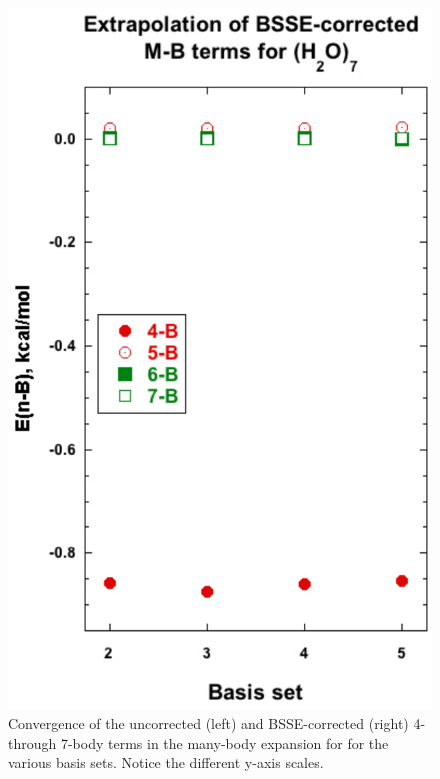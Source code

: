 \begin{figure}[t]
\begin{center}
\begin{minipage}{0.45\textwidth}
\includegraphics[width=.9\textwidth]{Figures/Chapter_2/MB_extrap_w7_BSSE.pdf}
\end{minipage}
\end{center}
\begin{spacing}{1.0}
\caption[Convergence of the uncorrected (left) and BSSE-corrected (right) 4- through 7-body terms in the many-body expansion for  for the various basis sets. Notice the different y-axis scales.]{Convergence of the uncorrected (left) and BSSE-corrected (right) 4- through 7-body terms in the many-body expansion for  for the various basis sets. Notice the different y-axis scales.}\label{fig:MBE_I_F4}
\end{spacing}
\end{figure}